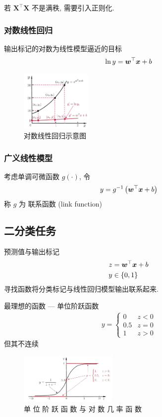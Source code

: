 若 $\bm{X}^\top\bm X$ 不是满秩, 需要引入正则化. %

\subsubsection{对数线性回归}
输出标记的对数为线性模型逼近的目标
\begin{align*}
    \ln y=\bm{w}^\top \bm{x} +b
\end{align*}

\begin{figure}[!htb]
    \centering
    \includegraphics[width=0.309\textwidth]{pic/ML3/对数线性回归示意图}
    \caption{对数线性回归示意图}
\end{figure}


\subsubsection{广义线性模型}
考虑单调可微函数 $g(\cdot)$, 令
\begin{align*}
    y=g^{-1}\left( \bm{w}^\top \bm{x}+b \right)
\end{align*}
称 $g$ 为 联系函数 (link function)

\subsection{二分类任务}
预测值与输出标记
\begin{align*}
    z&=\bm{w}^\top \bm{x} +b \\
    y&\in \{ 0,1 \}
\end{align*}
寻找函数将分类标记与线性回归模型输出联系起来. 

最理想的函数 --- 单位阶跃函数
\begin{align*}
    y=\left\{ \begin{array}{ll}
        0 & z<0\\
        0.5 & z=0\\
        1 & z>0
    \end{array} \right.
\end{align*}
但其不连续

\begin{figure}[!htb]
    \centering
    \includegraphics[width=0.42\textwidth]{pic/ML3/单 位 阶 跃 函 数 与 对 数 几 率 函 数}
    \caption{单 位 阶 跃 函 数 与 对 数 几 率 函 数}
\end{figure}


